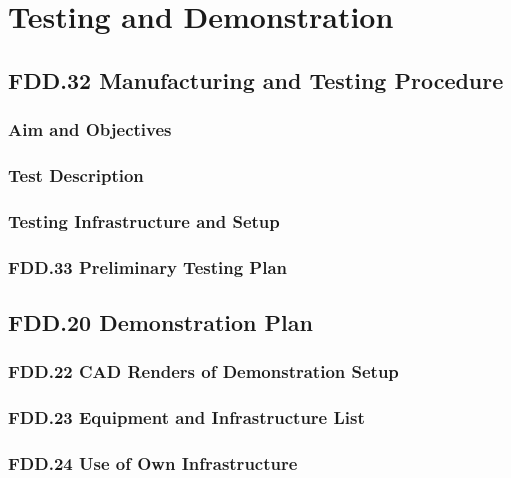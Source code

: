 \chapter{Testing and Demonstration}

\section{FDD.32 Manufacturing and Testing Procedure}
\subsection{Aim and Objectives}
\subsection{Test Description}
\subsection{Testing Infrastructure and Setup}

\subsection{FDD.33 Preliminary Testing Plan}

\section{FDD.20 Demonstration Plan}

\subsection{FDD.22 CAD Renders of Demonstration Setup}

\subsection{FDD.23 Equipment and Infrastructure List}

\subsection{FDD.24 Use of Own Infrastructure}
